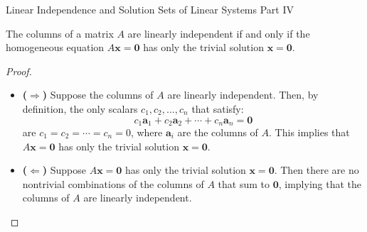 \documentclass[10pt, aspectratio=169]{beamer}
\begin{document}
\begin{frame}{Linear Independence and Solution Sets of Linear Systems Part IV}
    \begin{lemma}
        The columns of a matrix \(A\) are linearly independent if and only if the homogeneous equation \( A\mathbf{x} = \mathbf{0} \) has only the trivial solution \( \mathbf{x} = \mathbf{0} \).
    \end{lemma}
    \begin{proof}
        \begin{itemize}
            \item \textbf{(\(\Rightarrow\))} Suppose the columns of \( A \) are linearly independent. Then, by definition, the only scalars \( c_1, c_2, \dots, c_n \) that satisfy:
            \[
                c_1 \mathbf{a}_1 + c_2 \mathbf{a}_2 + \cdots + c_n \mathbf{a}_n = \mathbf{0}
            \]
            are \( c_1 = c_2 = \cdots = c_n = 0 \), where \( \mathbf{a}_i \) are the columns of \( A \). This implies that \( A\mathbf{x} = \mathbf{0} \) has only the trivial solution \( \mathbf{x} = \mathbf{0} \).
        
            \item \textbf{(\(\Leftarrow\))} Suppose \( A\mathbf{x} = \mathbf{0} \) has only the trivial solution \( \mathbf{x} = \mathbf{0} \). Then there are no nontrivial combinations of the columns of \( A \) that sum to \( \mathbf{0} \), implying that the columns of \( A \) are linearly independent.
        \end{itemize}
    \end{proof}
\end{frame}
\end{document}
